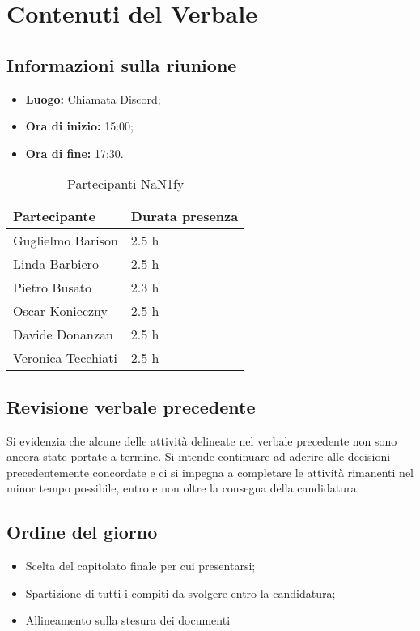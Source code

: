 \section{Contenuti del Verbale}
\subsection{Informazioni sulla riunione}
\begin{itemize}
	\setlength\itemsep{0em}
	\item\textbf{Luogo:} Chiamata Discord;
	\item\textbf{Ora di inizio:} 15:00;
	\item\textbf{Ora di fine:}  17:30.
\end{itemize}
\begin{table}[ht!]
	\begin{minipage}[t]{0.5\linewidth}
		\centering
		\begin{tabular}{p{3cm} p{3cm}}
			\toprule
			\textbf{Partecipante} & \textbf{Durata presenza} \\
			\midrule
			Guglielmo Barison & 2.5 h \\
			Linda Barbiero &  2.5 h \\
			Pietro Busato & 2.3 h \\
			Oscar Konieczny & 2.5 h \\
			Davide Donanzan & 2.5 h \\
			Veronica Tecchiati & 2.5 h \\
			\bottomrule
		\end{tabular}
		\caption{Partecipanti NaN1fy}
		\label{table:Partecipanti NaN1fy}
	\end{minipage}
\end{table}
\subsection{Revisione verbale precedente}
Si evidenzia che alcune delle attività delineate nel verbale precedente non sono ancora state portate a termine.
Si intende continuare ad aderire alle decisioni precedentemente concordate e ci si impegna a completare le attività rimanenti nel minor tempo possibile, entro e non oltre la consegna della candidatura.
\subsection{Ordine del giorno}
\begin{itemize}
	\setlength\itemsep{0em}
	\item Scelta del capitolato finale per cui presentarsi;
	\item Spartizione di tutti i compiti da svolgere entro la candidatura;
	\item Allineamento sulla stesura dei documenti
\end{itemize}
